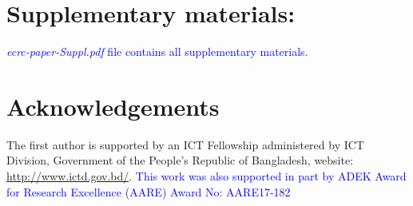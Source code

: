 \documentclass[3p,times]{elsarticle} %
\begin{document}
	
	
    
	
    
		
		
	
	
	
	
%	
	
	\section*{Supplementary materials:}
	\textcolor{blue}{\textit{ecrc-paper-Suppl.pdf} file contains all supplementary materials.}
	
	\section*{Acknowledgements}
	The first author is supported by an ICT Fellowship administered by ICT Division, Government of the People's Republic of Bangladesh, website: \url{http://www.ictd.gov.bd/}. \textcolor{blue}{This work was also supported in part by ADEK Award for Research Excellence (AARE) Award
	No: AARE17-182}
	

	
	
	
	
\end{document}
